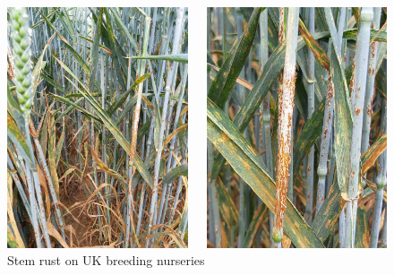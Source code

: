 \documentclass[10pt,dvipsnames,ignorenonframetext,aspectratio=169]{beamer}
\begin{document}
\begin{frame}{}
\protect\hypertarget{section-11}{}
\begin{figure}\caption{Stem rust on UK breeding nurseries}\begin{columns}

\begin{center}\includegraphics[width=0.55\linewidth]{../images/FWGDjevXwAEBzeT} \end{center}


\begin{center}\includegraphics[width=0.55\linewidth]{../images/FWGDkkkWYAA3yF4} \end{center}


\end{columns}
\end{figure}
\end{frame}
\end{document}
